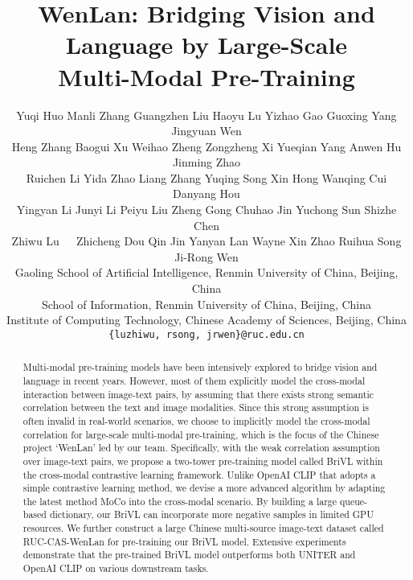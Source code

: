 \documentclass[10pt,twocolumn,letterpaper]{article}
\begin{document}
\title{WenLan: Bridging Vision and Language by Large-Scale \\ Multi-Modal Pre-Training }

\author{
Yuqi Huo Manli Zhang Guangzhen Liu Haoyu Lu Yizhao Gao Guoxing Yang Jingyuan Wen\\
Heng Zhang Baogui Xu Weihao Zheng Zongzheng Xi Yueqian Yang Anwen Hu Jinming Zhao \\
Ruichen Li Yida Zhao Liang Zhang Yuqing Song Xin Hong Wanqing Cui Danyang Hou\\
Yingyan Li Junyi Li Peiyu Liu Zheng Gong  Chuhao Jin Yuchong Sun Shizhe Chen\\
Zhiwu Lu~~~Zhicheng Dou Qin Jin Yanyan Lan Wayne Xin Zhao Ruihua Song Ji-Rong Wen\\
Gaoling School of Artificial Intelligence, Renmin University of China, Beijing, China\\
School of Information, Renmin University of China, Beijing, China\\
Institute of Computing Technology, Chinese Academy of Sciences, Beijing, China\\
{\tt\small \{luzhiwu, rsong, jrwen\}@ruc.edu.cn}
}

\maketitle

\begin{abstract}
Multi-modal pre-training models have been intensively explored to bridge vision and language in recent years. However, most of them explicitly model the cross-modal interaction between image-text pairs, by assuming that there exists strong semantic correlation between the text and image modalities. Since this strong assumption is often invalid in real-world scenarios, we choose to implicitly model the cross-modal correlation for large-scale multi-modal pre-training, which is the focus of the Chinese project `WenLan' led by our team. Specifically, with the weak correlation assumption over image-text pairs, we propose a two-tower pre-training model called BriVL within the cross-modal contrastive learning framework. Unlike OpenAI CLIP that adopts a simple contrastive learning method, we devise a more advanced algorithm by adapting the latest method MoCo into the cross-modal scenario. By building a large queue-based dictionary, our BriVL can incorporate more negative samples in limited GPU resources. We further construct a large Chinese multi-source image-text dataset called RUC-CAS-WenLan for pre-training our BriVL model. Extensive experiments demonstrate that the pre-trained BriVL model outperforms both UNITER and OpenAI CLIP on various downstream tasks.
\end{abstract}
\end{document}
